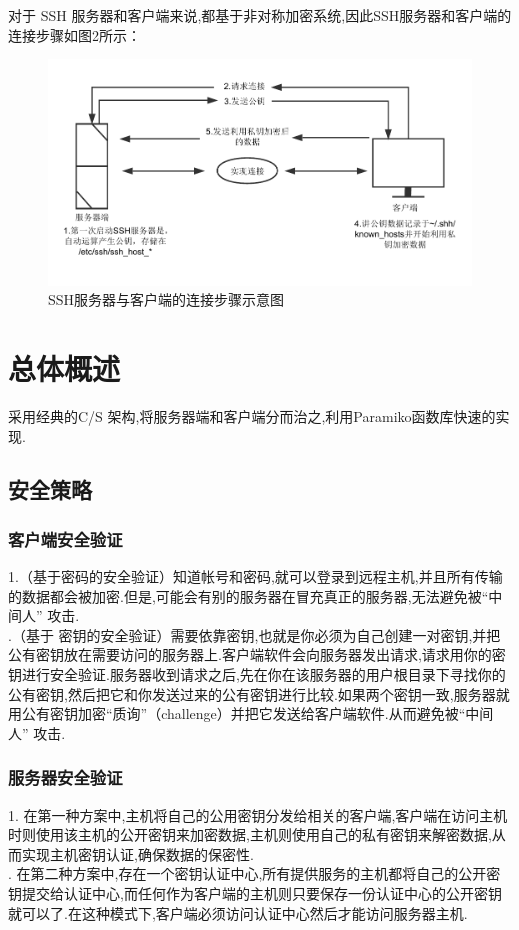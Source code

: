 \documentclass[UTF8,a4paper,cs4size]{ctexart}
\begin{document}
\indent 对于 SSH 服务器和客户端来说,都基于非对称加密系统,因此SSH服务器和客户端的连接步骤如图2所示：
\begin{figure}[htbp]
\centering
\includegraphics[scale = 0.7]{ssh.pdf}
\caption{SSH服务器与客户端的连接步骤示意图}
\end{figure}
\newpage
\section{总体概述}
采用经典的C/S 架构,将服务器端和客户端分而治之,利用Paramiko函数库快速的实现.
\subsection{安全策略}
\subsubsection{客户端安全验证}
1.（基于密码的安全验证）知道帐号和密码,就可以登录到远程主机,并且所有传输的数据都会被加密.但是,可能会有别的服务器在冒充真正的服务器,无法避免被“中间人” 攻击.\\
.（基于
密钥的安全验证）需要依靠密钥,也就是你必须为自己创建一对密钥,并把公有密钥放在需要访问的服务器上.客户端软件会向服务器发出请求,请求用你的密钥进行安全验证.服务器收到请求之后,先在你在该服务器的用户根目录下寻找你的公有密钥,然后把它和你发送过来的公有密钥进行比较.如果两个密钥一致,服务器就用公有密钥加密“质询”（challenge）并把它发送给客户端软件.从而避免被“中间人” 攻击.
\subsubsection{服务器安全验证}
1. 在第一种方案中,主机将自己的公用密钥分发给相关的客户端,客户端在访问主机时则使用该主机的公开密钥来加密数据,主机则使用自己的私有密钥来解密数据,从而实现主机密钥认证,确保数据的保密性.\\
. 在第二种方案中,存在一个密钥认证中心,所有提供服务的主机都将自己的公开密钥提交给认证中心,而任何作为客户端的主机则只要保存一份认证中心的公开密钥就可以了.在这种模式下,客户端必须访问认证中心然后才能访问服务器主机.
\end{document}
